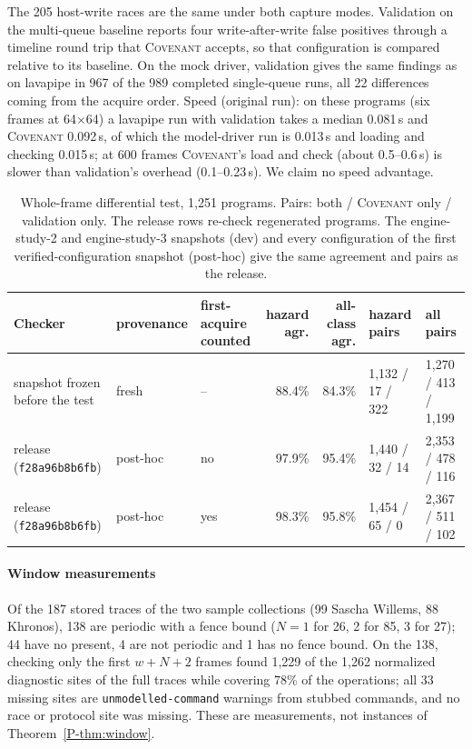 \documentclass[acmtog,anonymous,review]{acmart}
\newcommand{\sys}{\textsc{Covenant}\xspace}
\newcommand{\code}[1]{\texttt{#1}}
\newcommand{\relhash}{\code{f28a96b8b6fb}}
\begin{document}
The 205 host-write races are the same under both capture modes. Validation on the multi-queue baseline reports four
write-after-write false positives through a timeline round trip that \sys accepts, so that configuration is compared
relative to its baseline. On the mock driver, validation gives the same findings as on lavapipe in 967 of the 989
completed single-queue runs, all 22 differences coming from the acquire order. Speed (original run): on these programs
(six frames at 64$\times$64) a lavapipe run with validation takes a median 0.081\,s and \sys 0.092\,s, of which the
model-driver run is 0.013\,s and loading and checking 0.015\,s; at 600 frames \sys's load and check (about
0.5--0.6\,s) is slower than validation's overhead (0.1--0.23\,s). We claim no speed advantage.

\begin{table}[t]
\caption{Whole-frame differential test, 1,251 programs. Pairs: both / \sys only / validation only. The release rows
re-check regenerated programs. The engine-study-2 and engine-study-3 snapshots (dev) and every configuration of the first
verified-configuration snapshot (post-hoc) give the same agreement and pairs as the release.}
\label{tab:s-wholeframe}
\small
\begin{tabular}{@{}lllrrll@{}}
\toprule
Checker & provenance & first-acquire counted & hazard agr. & all-class agr. & hazard pairs & all pairs \\
\midrule
snapshot frozen before the test & fresh & -- & 88.4\% & 84.3\% & 1,132 / 17 / 322 & 1,270 / 413 / 1,199 \\
release (\relhash) & post-hoc & no & 97.9\% & 95.4\% & 1,440 / 32 / 14 & 2,353 / 478 / 116 \\
release (\relhash) & post-hoc & yes & 98.3\% & 95.8\% & 1,454 / 65 / 0 & 2,367 / 511 / 102 \\
\bottomrule
\end{tabular}
\end{table}

\paragraph{Window measurements}
Of the 187 stored traces of the two sample collections (99 Sascha Willems, 88 Khronos), 138 are periodic with a fence
bound ($N = 1$ for 26, 2 for 85, 3 for 27); 44 have no present, 4 are not periodic and 1 has no fence bound. On the 138,
checking only the first $w + N + 2$ frames found 1,229 of the 1,262 normalized diagnostic sites of the full traces while
covering 78\% of the operations; all 33 missing sites are \code{unmodelled-command} warnings from stubbed commands, and
no race or protocol site was missing. These are measurements, not instances of Theorem~\ref{P-thm:window}.
\end{document}
